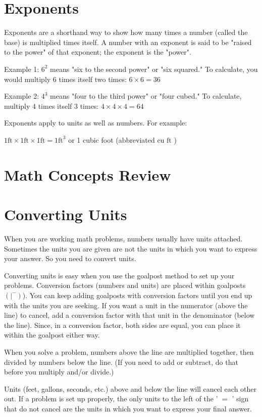 \begin{enumerate}
\section{Exponents}
Exponents are a shorthand way to show how many times a number (called the base) is multiplied times itself. A number with an exponent is said to be "raised to the power" of that exponent; the exponent is the "power".

Example 1: $6^{2}$ means "six to the second power" or "six squared." To calculate, you would multiply 6 times itself two times: $6 \times 6=36$

Example 2: $4^{3}$ means "four to the third power" or "four cubed." To calculate, multiply 4 times itself 3 times: $4 \times 4 \times 4=64$

Exponents apply to units as well as numbers. For example:

$1 \mathrm{ft} \times 1 \mathrm{ft} \times 1 \mathrm{ft}=1 \mathrm{ft}^{3}$ or 1 cubic foot (abbreviated cu $\mathrm{ft}$ )

\section{Math Concepts Review}
\section{Converting Units}
When you are working math problems, numbers usually have units attached. Sometimes the units you are given are not the units in which you want to express your answer. So you need to convert units.

Converting units is easy when you use the goalpost method to set up your problems. Conversion factors (numbers and units) are placed within goalposts $\left(\left.\right|^{-}\right)$). You can keep adding goalposts with conversion factors until you end up with the units you are seeking. If you want a unit in the numerator (above the line) to cancel, add a conversion factor with that unit in the denominator (below the line). Since, in a conversion factor, both sides are equal, you can place it within the goalpost either way.

When you solve a problem, numbers above the line are multiplied together, then divided by numbers below the line. (If you need to add or subtract, do that before you multiply and/or divide.)

Units (feet, gallons, seconds, etc.) above and below the line will cancel each other out. If a problem is set up properly, the only units to the left of the ' $=$ ' sign that do not cancel are the units in which you want to express your final answer.


\end{enumerate}
